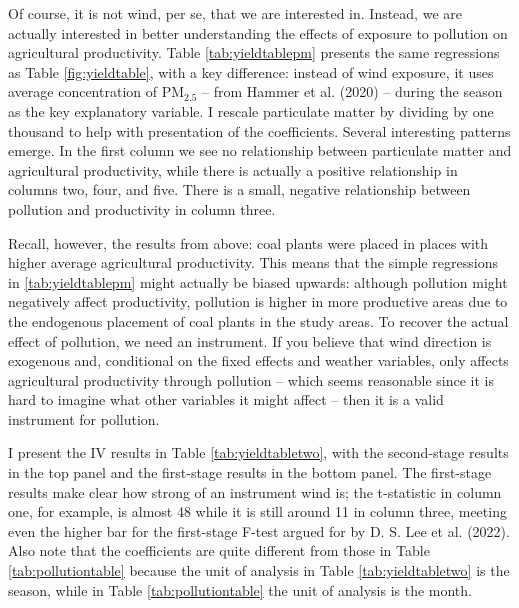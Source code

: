 \documentclass[
]{article}
\begin{document}
Of course, it is not wind, per se, that we are interested in. Instead, we are actually interested in better understanding the effects of exposure to pollution on agricultural productivity. Table \ref{tab:yieldtablepm} presents the same regressions as Table \ref{fig:yieldtable}, with a key difference: instead of wind exposure, it uses average concentration of \(\mathrm{PM_{2.5}}\) -- from Hammer et al. (2020) -- during the season as the key explanatory variable. I rescale particulate matter by dividing by one thousand to help with presentation of the coefficients. Several interesting patterns emerge. In the first column we see no relationship between particulate matter and agricultural productivity, while there is actually a positive relationship in columns two, four, and five. There is a small, negative relationship between pollution and productivity in column three.

Recall, however, the results from above: coal plants were placed in places with higher average agricultural productivity. This means that the simple regressions in \ref{tab:yieldtablepm} might actually be biased upwards: although pollution might negatively affect productivity, pollution is higher in more productive areas due to the endogenous placement of coal plants in the study areas. To recover the actual effect of pollution, we need an instrument. If you believe that wind direction is exogenous and, conditional on the fixed effects and weather variables, only affects agricultural productivity through pollution -- which seems reasonable since it is hard to imagine what other variables it might affect -- then it is a valid instrument for pollution.

I present the IV results in Table \ref{tab:yieldtabletwo}, with the second-stage results in the top panel and the first-stage results in the bottom panel. The first-stage results make clear how strong of an instrument wind is; the t-statistic in column one, for example, is almost 48 while it is still around 11 in column three, meeting even the higher bar for the first-stage F-test argued for by D. S. Lee et al. (2022). Also note that the coefficients are quite different from those in Table \ref{tab:pollutiontable} because the unit of analysis in Table \ref{tab:yieldtabletwo} is the season, while in Table \ref{tab:pollutiontable} the unit of analysis is the month.
\end{document}
